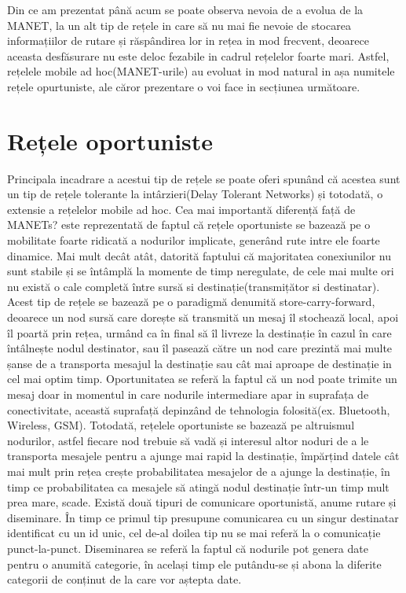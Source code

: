\documentclass[12pt,a4paper]{report}
\begin{document}
Din ce am prezentat până acum se poate observa nevoia de a evolua de la MANET, la un alt tip de rețele in care să 
nu mai fie nevoie de stocarea informațiilor de rutare și răspândirea lor in rețea in mod frecvent, deoarece aceasta desfăsurare nu este deloc fezabile in cadrul rețelelor foarte mari. Astfel, rețelele mobile ad hoc(MANET-urile) au evoluat in mod natural in așa numitele rețele opurtuniste, ale căror prezentare o voi face in secțiunea următoare.

\section{Rețele oportuniste}
Principala incadrare a acestui tip de rețele se poate oferi spunând că acestea sunt un tip de rețele tolerante la intârzieri(Delay Tolerant Networks) și totodată, o extensie a rețelelor mobile ad hoc. Cea mai importantă diferență față de MANETs? este reprezentată de faptul că rețele oportuniste se bazează pe o mobilitate foarte ridicată a nodurilor implicate, generând rute intre ele foarte dinamice. Mai mult decât atât, datorită faptului că majoritatea conexiunilor nu sunt stabile și se întâmplă la momente de timp neregulate, de cele mai multe ori nu există o cale completă între sursă si destinație(transmițător si destinatar). Acest tip de rețele se bazează pe o paradigmă denumită store-carry-forward, deoarece un nod sursă care dorește să transmită un mesaj îl stochează local, apoi îl poartă prin rețea, urmând ca în final să îl livreze la destinație în cazul în care întâlnește nodul destinator, sau îl pasează către un nod care prezintă mai multe șanse de a transporta mesajul la destinație sau cât mai aproape de destinație in cel mai optim timp.
Oportunitatea se referă la faptul că un nod poate trimite un mesaj doar in momentul in care nodurile intermediare apar in suprafața de conectivitate, această suprafață depinzând de tehnologia folosită(ex. Bluetooth, Wireless, GSM).  Totodată, rețelele oportuniste se bazează pe altruismul nodurilor, astfel fiecare nod trebuie să vadă și interesul altor noduri de a le transporta mesajele pentru a ajunge mai rapid la destinație, împărțind datele cât mai mult prin rețea crește probabilitatea mesajelor de a ajunge la destinație, în timp ce probabilitatea ca mesajele să atingă nodul destinație într-un timp mult prea mare, scade. Există două tipuri de comunicare oportunistă, anume rutare și diseminare. În timp ce primul tip presupune comunicarea cu un singur destinatar identificat cu un id unic, cel de-al doilea tip nu se mai referă la o comunicație punct-la-punct. Diseminarea se referă la faptul că nodurile pot genera date pentru o anumită categorie, în același timp ele putându-se și abona la diferite categorii de conținut de la care vor aștepta date. 
\end{document}
